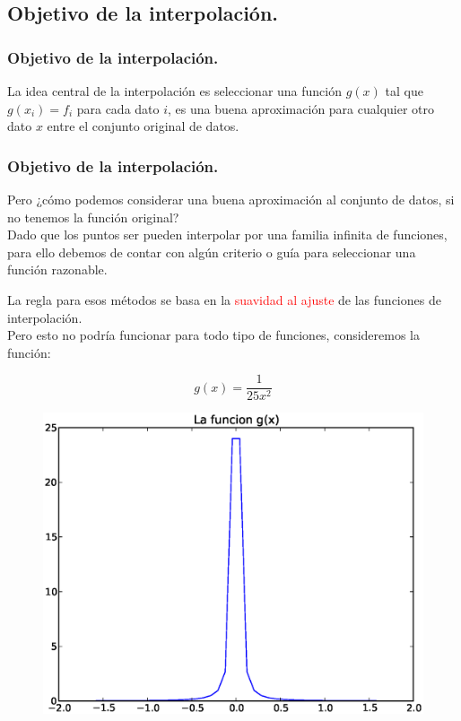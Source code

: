 \subsection{Objetivo de la interpolación.}
\begin{frame}
\frametitle{Objetivo de la interpolación.}
La idea central de la interpolación es seleccionar una función $g(x)$ tal que $g(x_{i}) = f_{i}$ para cada dato $i$, es una buena aproximación para cualquier otro dato $x$ entre el conjunto original de datos.
\end{frame}
\begin{frame}
\frametitle{Objetivo de la interpolación.}
Pero ¿cómo podemos considerar una buena aproximación al conjunto de datos, si no tenemos la función original?
\\
\bigskip
Dado que los puntos ser pueden interpolar por una familia infinita de funciones, para ello debemos de contar con algún criterio o guía para seleccionar una función razonable.
\end{frame}
\begin{frame}
La regla para esos métodos se basa en la \textcolor{red}{suavidad al ajuste} de las funciones de interpolación.
\\
\bigskip
\pause
Pero esto no podría funcionar para todo tipo de funciones, consideremos la función:
\\
\medskip
\begin{minipage}{3cm}
\[g(x) = \dfrac{1}{25 x^{2}}\]
\end{minipage}
\hspace{0.5cm}
\begin{minipage}{6cm}
\begin{figure}
	\centering
	 \includegraphics[scale=0.3]{Imagenes/grafica02.eps}  
\end{figure}
\end{minipage}
\end{frame}
